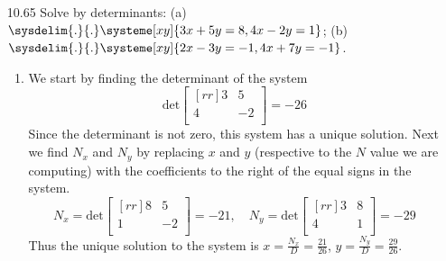 \documentclass[12pt]{article}
\theoremstyle{definition}
\theoremstyle{plain}
\begin{document}
\begin{enumerate}
\item[10.65]Solve by determinants: (a) $\sysdelim{.}{.}\systeme[xy]{3x+5y=8,4x-2y=1}$; (b) $\sysdelim{.}{.}\systeme[xy]{2x-3y=-1,4x+7y=-1}$.
	\begin{enumerate}
	\item We start by finding the determinant of the system
	\[ \mathrm{det}\begin{bmatrix}[rr]3&5\\4&-2\\\end{bmatrix} = -26 \]
	Since the determinant is not zero, this system has a unique solution. Next we find $N_x$ and $N_y$ by replacing $x$ and $y$ (respective to the $N$ value we are computing) with the coefficients to the right of the equal signs in the system.
	\[ N_x = \mathrm{det}\begin{bmatrix}[rr]8&5\\1&-2\\\end{bmatrix} = -21, \quad N_y = \mathrm{det}\begin{bmatrix}[rr]3&8\\4&1\\\end{bmatrix} = -29 \]
	Thus the unique solution to the system is $x=\frac{N_x}{D} = \frac{21}{26}$, $y=\frac{N_y}{D} = \frac{29}{26}$.
	\end{enumerate}		
	

\end{enumerate}
\end{document}
